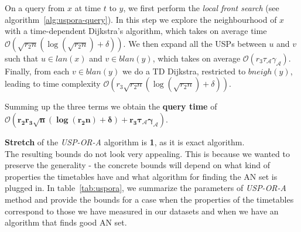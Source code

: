		\begin{figure}[htb]
		\centering
		\end{figure}
		
		On a query from $x$ at time $t$ to $y$, we first perform the \textit{local front search} (see algorithm~\ref{alg:uspora-query}). In this step we explore the neighbourhood of $x$ with a time-dependent Dijkstra's algorithm, which takes on average time $\mathcal{O}(\sqrt{r_{2}n} (\log (\sqrt{r_{2}n}) + \delta))$. We then expand all the USPs between $u$ and $v$ such that $u \in lan(x)$ and $v \in blan(y)$, which takes on average $\mathcal{O}(r_{3} \tau_{\mathcal{A}} \gamma_{\mathcal{A}})$. Finally, from each $v \in blan(y)$ we do a TD Dijkstra, restricted to $bneigh(y)$, leading to time complexity $\mathcal{O}(r_{3}\sqrt{r_{2}n} (\log (\sqrt{r_{2}n}) + \delta))$.
		
		Summing up the three terms we obtain the \textbf{query time} of $\bm{\mathcal{O}(r_{2} r_{3} \sqrt{n} (\log (r_{2}n) + \delta) + r_{3} \tau_{\mathcal{A}} \gamma_{\mathcal{A}})}$.
		
		\textbf{Stretch} of the \textit{USP-OR-A} algorithm is \textbf{1}, as it is exact algorithm. \\
		
		\noindent The resulting bounds do not look very appealing. This is because we wanted to preserve the generality - the concrete bounds will depend on what kind of properties the timetables have and what algorithm for finding the AN set is plugged in. In table~\ref{tab:uspora}, we summarize the parameters of \textit{USP-OR-A} method and provide the bounds for a case when the properties of the timetables correspond to those we have measured in our datasets and when we have an algorithm that finds good AN set.
		
